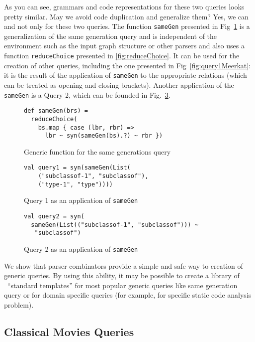 As you can see, grammars and code representations for these two queries looks pretty similar.
May we avoid code duplication and generalize them? 
Yes, we can and not only for these two queries.
The function \lstinline{sameGen} presented in Fig~\ref{fig:gen} is a generalization of the same generation query and is independent of the environment such as the input graph structure or other parsers and also uses a function \lstinline{reduceChoice} presented in \ref{fig:reduceChoice}.
It can be used for the creation of other queries, including the one presented in Fig~\ref{fig:query1Meerkat}: it is the result of the application of \lstinline{sameGen} to the appropriate relations (which can be treated as opening and closing brackets).
Another application of the \lstinline{sameGen} is a Query 2, which can be founded in Fig.~\ref{fig:query2Gen}.


\begin{figure}[h]
\begin{lstlisting}
def sameGen(brs) =
  reduceChoice(
    bs.map { case (lbr, rbr) => 
      lbr ~ syn(sameGen(bs).?) ~ rbr }) 
\end{lstlisting}
\caption{Generic function for the same generations query}
\label{fig:gen}
\end{figure}


\begin{figure}[h]
\begin{lstlisting}
val query1 = syn(sameGen(List(
    ("subclassof-1", "subclassof"),
    ("type-1", "type"))))
\end{lstlisting}
\caption{Query 1 as an application of \lstinline{sameGen}}
\label{fig:query1Gen}
\end{figure}


\begin{figure}[h]
\begin{lstlisting}
val query2 = syn(
  sameGen(List(("subclassof-1", "subclassof"))) ~
   "subclassof")
\end{lstlisting}
\caption{Query 2 as an application of \lstinline{sameGen}}
\label{fig:query2Gen}
\end{figure}


We show that parser combinators provide a simple and safe way to creation of generic queries.
By using this ability, it may be possible to create a library of \ ``standard templates'' for most popular generic queries like same generation query or for domain specific queries (for example, for specific static code analysis problem).


\subsection{Classical Movies Queries}

